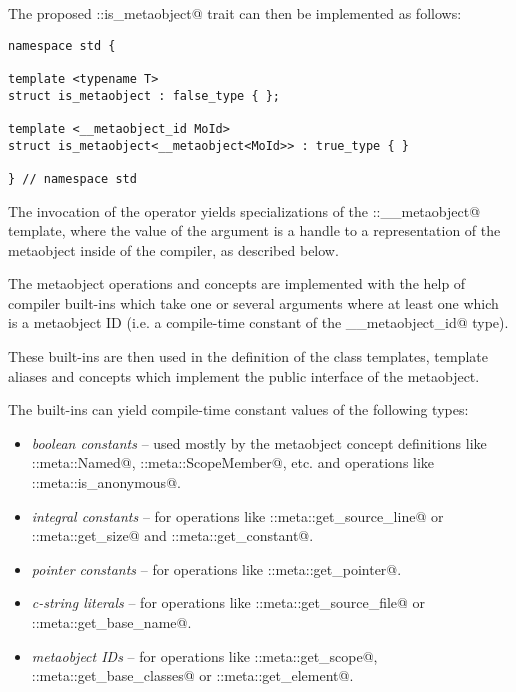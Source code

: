 The proposed \verb@std::is_metaobject@ trait can then be implemented as follows: 

\begin{verbatim}
namespace std {

template <typename T>
struct is_metaobject : false_type { };

template <__metaobject_id MoId>
struct is_metaobject<__metaobject<MoId>> : true_type { }

} // namespace std
\end{verbatim}

The invocation of the \verb@reflexpr@ operator yields specializations of
the \verb@std::__metaobject@ template, where the value of the \verb@MoId@
argument is a handle to a representation of the metaobject inside of
the compiler, as described below. 


The metaobject operations and concepts are implemented with the help of compiler
built-ins which take one or several arguments where at least one which is
a metaobject ID (i.e. a compile-time constant of the \verb@__metaobject_id@ type).

These built-ins are then used in the definition of the class templates,
template aliases and concepts which implement the public interface of
the metaobject.

The built-ins can yield compile-time constant values of the following types: 


\begin{itemize}
\item{{\em boolean constants} -- used mostly by the metaobject concept definitions
like \verb@std::meta::Named@, \verb@std::meta::ScopeMember@, etc. and operations
like \verb@std::meta::is_anonymous@.}

\item{{\em integral constants} -- for operations like \verb@std::meta::get_source_line@
or \verb@std::meta::get_size@ and \verb@std::meta::get_constant@.}

\item{{\em pointer constants} -- for operations like \verb@std::meta::get_pointer@.}

\item{{\em c-string literals} -- for operations like \verb@std::meta::get_source_file@
or \verb@std::meta::get_base_name@.}

\item{{\em metaobject IDs} -- for operations like \verb@std::meta::get_scope@,
\verb@std::meta::get_base_classes@ or \verb@std::meta::get_element@.}
\end{itemize}


